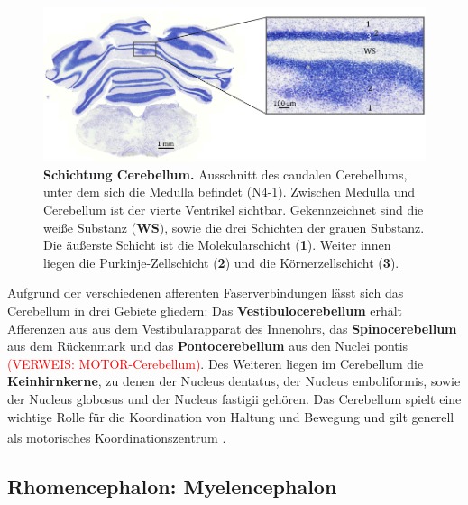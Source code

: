 \documentclass[12pt,a4paper,pdftex]{article}
\begin{document}
\begin{figure}[H]
    \centering
    \includegraphics[width=\textwidth]{pictures/Bilder_Jule/Ratte/cerebellum.png}
    \caption[Schichtung Cerebellum]{\textbf{Schichtung Cerebellum.} Ausschnitt des caudalen Cerebellums, unter dem sich die Medulla befindet (N4-1). Zwischen Medulla und Cerebellum ist der vierte Ventrikel sichtbar. Gekennzeichnet sind die weiße Substanz (\textbf{WS}), sowie die drei Schichten der grauen Substanz. Die äußerste Schicht ist die Molekularschicht (\textbf{1}). Weiter innen liegen die Purkinje-Zellschicht (\textbf{2}) und die Körnerzellschicht (\textbf{3}).}
    \label{fig:cerebellum_ratte}
\end{figure}

\noindent Aufgrund der verschiedenen afferenten Faserverbindungen lässt sich das Cerebellum in drei Gebiete gliedern: Das \textbf{Vestibulocerebellum} erhält Afferenzen aus aus dem Vestibularapparat des Innenohrs, das \textbf{Spinocerebellum} aus dem Rückenmark und das \textbf{Pontocerebellum} aus den Nuclei pontis \textcolor{red}{(VERWEIS: MOTOR-Cerebellum)}. Des Weiteren liegen im Cerebellum die \textbf{Keinhirnkerne}, zu denen der Nucleus dentatus, der Nucleus emboliformis, sowie der Nucleus globosus und der Nucleus fastigii gehören. Das Cerebellum spielt eine wichtige Rolle für die Koordination von Haltung und Bewegung und gilt generell als motorisches Koordinationszentrum \textsuperscript{\cite[7]{trepel2011neuroanatomie}}.




\subsection{Rhomencephalon: Myelencephalon}
\label{subsec:Myelencephalon} 
\end{document}
